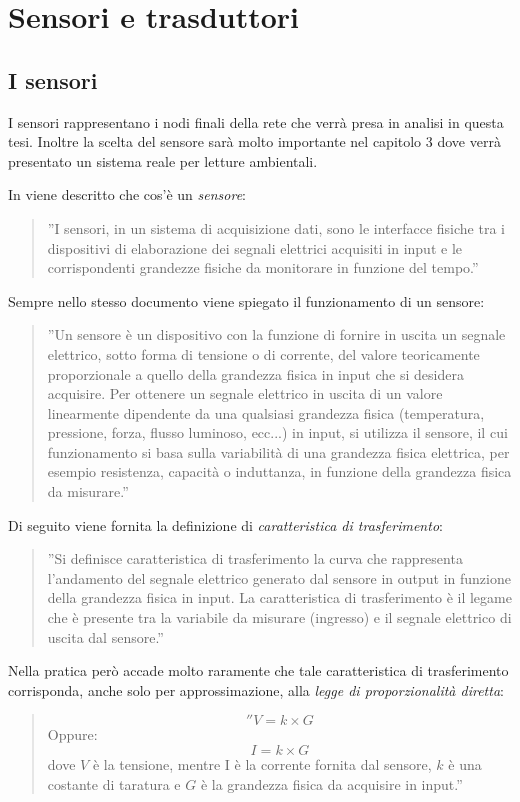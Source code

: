\documentclass[a4paper]{report} %
\begin{document}
\section{Sensori e trasduttori}
\subsection{I sensori}
I sensori rappresentano i nodi finali della rete che verrà presa in analisi in questa tesi. Inoltre la scelta del sensore sarà molto importante nel capitolo 3 dove verrà presentato un sistema reale per letture ambientali. 

In \cite{art:rif.1} viene descritto che cos'è un \textit{sensore}:
\begin{quote}
	''I sensori, in un sistema di acquisizione dati, sono le interfacce fisiche tra i dispositivi di elaborazione dei segnali elettrici acquisiti in input e le corrispondenti grandezze fisiche da monitorare in funzione del tempo.''
\end{quote} 
Sempre nello stesso documento viene spiegato il funzionamento di un sensore:
\begin{quote}
	''Un sensore è un dispositivo con la funzione di fornire in uscita un segnale elettrico, sotto forma di tensione o di corrente, del valore teoricamente proporzionale a quello della grandezza fisica in input che si desidera acquisire. 	
	Per ottenere un segnale elettrico in uscita di un valore linearmente dipendente da una qualsiasi grandezza fisica (temperatura, pressione, forza, flusso luminoso, ecc...) in input, si utilizza il sensore, il cui funzionamento si basa sulla variabilità di una grandezza fisica elettrica, per esempio resistenza, capacità o induttanza, in funzione della grandezza fisica da misurare.''
\end{quote}
Di seguito viene fornita la definizione di \textit{caratteristica di trasferimento}:	
\begin{quote}
	''Si definisce caratteristica di trasferimento la curva che rappresenta l'andamento del segnale elettrico generato dal sensore in output in funzione della grandezza fisica in input.
	La caratteristica di trasferimento è il legame che è presente tra la variabile da misurare (ingresso) e il segnale elettrico di uscita dal sensore.''
\end{quote}
Nella pratica però accade molto raramente che tale caratteristica di trasferimento corrisponda, anche solo per approssimazione, alla \textit{legge di proporzionalità diretta}: 
\begin{quote}
	\begin{equation}
	''V = k \times G
	\end{equation}
	Oppure:
	\begin{equation}
	I = k \times G
	\end{equation}
	dove $V$ è la tensione, mentre I è la corrente fornita dal sensore, $k$ è una costante di taratura e $G$ è la grandezza fisica da acquisire in input.'' 
\end{quote} 
\end{document}
